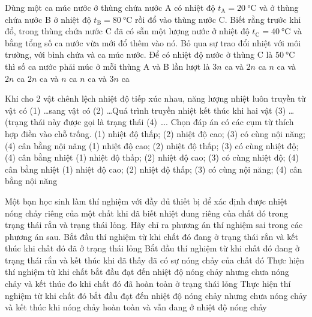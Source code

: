 \begin{ex}
	Dùng một ca múc nước ở thùng chứa nước A có nhiệt độ $t_{\mathrm{A}}=\SI{20}{\celsius}$ và ở thùng chứa nước B ở nhiệt độ $t_{\mathrm{B}}=\SI{80}{\celsius}$ rồi đổ vào thùng nước C. Biết rằng trước khi đổ, trong thùng chứa nước C đã có sẵn một lượng nước ở nhiệt độ $t_{\mathrm{C}}=\SI{40}{\celsius}$ và bằng tổng số ca nước vừa mới đổ thêm vào nó. Bỏ qua sự trao đổi nhiệt với môi trường, với bình chứa và ca múc nước. Để có nhiệt độ nước ở thùng C là $\SI{50}{\celsius}$ thì số ca nước phải múc ở mỗi thùng A và B lần lượt là
	\choice
	{$3n$ ca và $2n$ ca}
	{\True $n$ ca và $2n$ ca}
	{$2n$ ca và $n$ ca}
	{$n$ ca và $3n$ ca}
\end{ex}
\begin{ex}
	Khi cho 2 vật chênh lệch nhiệt độ tiếp xúc nhau, năng lượng nhiệt luôn truyền từ vật có (1) \dots sang vật có (2) \dots Quá trình truyền nhiệt kết thúc khi hai vật (3) \dots (trạng thái này được gọi là trạng thái (4) \dots. Chọn đáp án có các cụm từ thích hợp điền vào chỗ trống.	
	\choice
	{(1) nhiệt độ thấp;	(2) nhiệt độ cao; (3) có cùng nội năng; (4) cân bằng nội năng}
	{\True (1) nhiệt độ cao;	(2) nhiệt độ thấp; (3) có cùng nhiệt độ; (4) cân bằng nhiệt}
	{(1) nhiệt độ thấp; (2) nhiệt độ cao; (3) có cùng nhiệt độ; (4) cân bằng nhiệt}
	{(1) nhiệt độ cao; (2) nhiệt độ thấp; (3) có cùng nội năng; (4) cân bằng nội năng}
	\loigiai{}
\end{ex}
\begin{ex}
	Một bạn học sinh làm thí nghiệm với đầy đủ thiết bị để xác định được nhiệt nóng chảy riêng của một chất khi đã biết nhiệt dung riêng của chất đó trong trạng thái rắn và trạng thái lỏng. Hãy chỉ ra phương án thí nghiệm sai trong các phương án sau.
	\choice
	{Bắt đầu thí nghiệm từ khi chất đó đang ở trạng thái rắn và kết thúc khi chất đó đã ở trạng thái lỏng}
	{\True Bắt đầu thí nghiệm từ khi chất đó đang ở trạng thái rắn và kết thúc khi đã thấy đã có sự nóng chảy của chất đó}
	{Thực hiện thí nghiệm từ khi chất bắt đầu đạt đến nhiệt độ nóng chảy nhưng chưa nóng chảy và kết thúc đo khi chất đó đã hoàn toàn ở trạng thái lỏng}
	{Thực hiện thí nghiệm từ khi chất đó bắt đầu đạt đến nhiệt độ nóng chảy nhưng chưa nóng chảy và kết thúc khi nóng chảy hoàn toàn và vẫn đang ở nhiệt độ nóng chảy}
	\loigiai{}
\end{ex}
